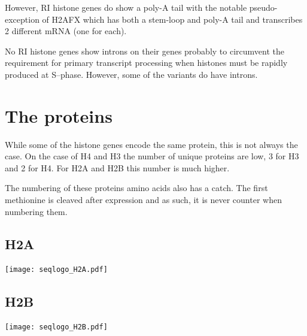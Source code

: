 \documentclass[10pt,a4paper,draft,article]{memoir}
\begin{document}
      However, RI histone genes do show a poly-A tail with the notable pseudo-exception of H2AFX which has both
      a stem-loop and poly-A tail and transcribes 2 different mRNA (one for each).

      No RI histone genes show introns on their genes probably to circumvent the requirement
      for primary transcript processing when histones must be rapidly produced at S--phase.
      However, some of the variants do have introns.

  \section{The proteins}
    While some of the histone genes encode the same protein, this is not always the case. On the case of H4 and H3  the number of unique proteins are low, 3 for H3 and 2 for H4. For H2A and H2B
    this number is much higher.

    The numbering of these proteins amino acids also has a catch. The first methionine is cleaved after expression and as such, it is
    never counter when numbering them.

    \subsection{H2A}
      \begin{TableAndFigure}
        \label{tab:H2A-consensus}
        

        \texttt{[image: seqlogo\_H2A.pdf]}
        \label{fig:H2A-weblogo}
      \end{TableAndFigure}


    \subsection{H2B}
      \begin{TableAndFigure}
        \label{tab:H2B-consensus}
        

        \texttt{[image: seqlogo\_H2B.pdf]}
        \label{fig:H2B-weblogo}
      \end{TableAndFigure}
\end{document}
